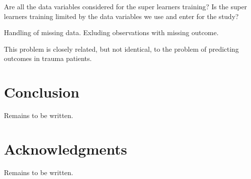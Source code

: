 \documentclass[10pt,letterpaper]{article}\usepackage[]{graphicx}\usepackage[]{color}
\begin{document}
Are all the data variables considered for the super learners training? Is the
super learners training limited by the data variables we use and enter for the
study?

Handling of missing data. Exluding observations with missing outcome.

This problem is closely related, but not identical, to the problem of predicting
outcomes in trauma patients.

\section*{Conclusion}
Remains to be written.
\section*{Acknowledgments}
Remains to be written.


\end{document}
